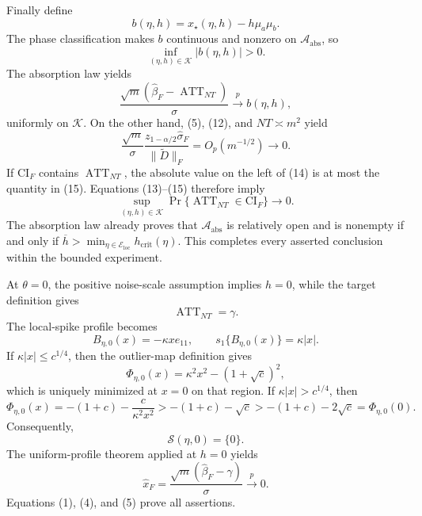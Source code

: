 Finally define
\[
 b(\eta,h)=x_\star(\eta,h)-h\mu_a\mu_b.
\]
The phase classification makes \(b\) continuous and nonzero on \(\mathcal A_{\mathrm{abs}}\), so
\[
 \inf_{(\eta,h)\in\mathcal K}|b(\eta,h)|>0. \tag{13}
\]
The absorption law yields
\[
 \frac{\sqrt m(\widehat\beta_F-\operatorname{ATT}_{NT})}{\sigma}
 \xrightarrow{p}b(\eta,h), \tag{14}
\]
uniformly on \(\mathcal K\).  On the other hand, (5), (12), and \(NT\asymp m^2\) yield
\[
 \frac{\sqrt m}{\sigma}
 \frac{z_{1-\alpha/2}\widehat\sigma_F}{\|\widetilde D\|_F}
 =O_p(m^{-1/2})\longrightarrow0. \tag{15}
\]
If \(\mathrm{CI}_F\) contains \(\operatorname{ATT}_{NT}\), the absolute value on the left of (14) is at most the quantity in (15).  Equations (13)--(15) therefore imply
\[
 \sup_{(\eta,h)\in\mathcal K}
 \Pr\{\operatorname{ATT}_{NT}\in\mathrm{CI}_F\}\longrightarrow0. \tag{16}
\]
The absorption law already proves that \(\mathcal A_{\mathrm{abs}}\) is relatively open and is nonempty if and only if
\(\overline h>\min_{\eta\in\mathcal E_{\mathrm{loc}}}h_{\mathrm{crit}}(\eta)\).  This completes every asserted conclusion within the bounded experiment.

At \(\theta=0\), the positive noise-scale assumption implies \(h=0\), while the target definition gives
\[
 \operatorname{ATT}_{NT}=\gamma. \tag{1}
\]
The local-spike profile becomes
\[
 B_{\eta,0}(x)=-\kappa xe_{11},
 \qquad s_1\{B_{\eta,0}(x)\}=\kappa|x|. \tag{2}
\]
If \(\kappa|x|\leq c^{1/4}\), then the outlier-map definition gives
\[
 \Phi_{\eta,0}(x)=\kappa^2x^2-(1+\sqrt c)^2,
\]
which is uniquely minimized at \(x=0\) on that region.  If \(\kappa|x|>c^{1/4}\), then
\[
 \Phi_{\eta,0}(x)=-(1+c)-\frac{c}{\kappa^2x^2}
 >-(1+c)-\sqrt c
 >-(1+c)-2\sqrt c=\Phi_{\eta,0}(0). \tag{3}
\]
Consequently,
\[
 \mathcal S(\eta,0)=\{0\}. \tag{4}
\]
The uniform-profile theorem applied at \(h=0\) yields
\[
 \widehat x_F=\frac{\sqrt m(\widehat\beta_F-\gamma)}\sigma\xrightarrow{p}0. \tag{5}
\]
Equations (1), (4), and (5) prove all assertions.

